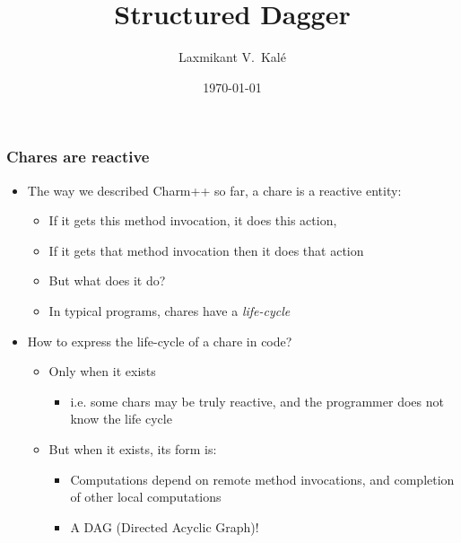 \documentclass{beamer}
\title{Structured Dagger}
\institute[UIUC]{Parallel Programming Laboratory \\University of Illinois Urbana-Champaign}
\author{Laxmikant V.~Kal\'e}
\date{\today}
\begin{document}
\frame{\titlepage}


\begin{frame}[fragile]
  \frametitle{Chares are reactive}
  \begin{itemize}
    \item The way we described Charm++ so far, a chare is a reactive entity:
      \begin{itemize}
      \item If it gets this method invocation, it does this action,
      \item If it gets that method invocation then it does that action
      \item But what does it do?
      \item In typical programs, chares have a \emph{life-cycle}
      \end{itemize}
    \item How to express the life-cycle of a chare in code?
      \begin{itemize}
      \item Only when it exists
        \begin{itemize}
        \item i.e. some chars may be truly reactive, and the programmer does
          not know the life cycle
        \end{itemize}
      \item But when it exists, its form is:
        \begin{itemize}
        \item Computations depend on remote method invocations, and completion
          of other local computations
        \item A DAG (Directed Acyclic Graph)!
        \end{itemize}
      \end{itemize}
  \end{itemize}
\end{frame}
\end{document}
